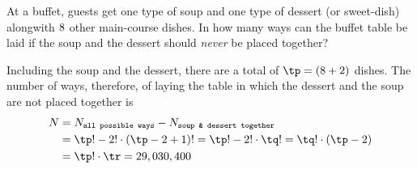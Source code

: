 



\gcalcexpr[0]
\gcalcexpr[0]
\gcalcexpr[0]

\question[3] At a buffet, guests get one type of soup and one type of dessert (or sweet-dish) alongwith $8$ other 
main-course dishes. In how many ways can the buffet table be laid if the soup and the dessert should \textit{never} be
placed together? 


\watchout

\ifprintanswers
\fi 

\begin{solution}[\mcq]
  Including the soup and the dessert, there are a total of $\tp = (\vbone + 2)$ dishes. The number of ways, therefore, 
  of laying the table in which the dessert and the soup are not placed together is 
  \begin{align}
  	N &= N_{\texttt{all possible ways}} - N_{\texttt{soup \& dessert together}} \\
  	  &= \tp ! - 2!\cdot\left( \tp - 2 + 1\right) ! = \tp ! - 2!\cdot\tq ! = \tq !\cdot(\tp - 2) \\
  	  &= \tp!\cdot\tr = \vbtwo
  \end{align}
\end{solution}
